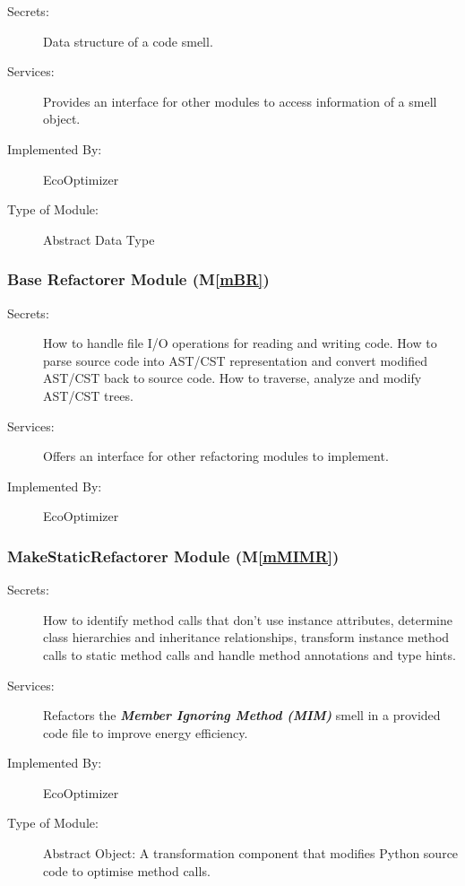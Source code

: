 \documentclass[12pt, titlepage]{article}
\newcommand{\mref}[1]{M\ref{#1}}
\begin{document}
\begin{description}
\item[Secrets:] Data structure of a code smell.
\item[Services:] Provides an interface for other modules to access information of a smell object.
\item[Implemented By:] EcoOptimizer
\item[Type of Module:] Abstract Data Type
\end{description}

\subsubsection{Base Refactorer Module (\mref{mBR})}


\begin{description}
    \item[Secrets:] How to handle file I/O operations for reading and writing code. How to parse source code into AST/CST representation and convert modified AST/CST back to source code. How to traverse, analyze and modify AST/CST trees.
    \item[Services:] Offers an interface for other refactoring modules to implement.
    \item[Implemented By:] EcoOptimizer
\end{description}

\subsubsection{MakeStaticRefactorer Module (\mref{mMIMR})}

\begin{description}
\item[Secrets:] How to identify method calls that don't use instance attributes, determine class hierarchies and inheritance relationships, transform instance method calls to static method calls and handle method annotations and type hints.
\item[Services:] Refactors the \textit{\textbf{Member Ignoring Method (MIM)}} smell in a provided code file to improve energy efficiency.
\item[Implemented By:] EcoOptimizer
\item[Type of Module:] Abstract Object: A transformation component that modifies Python source code to optimise method calls.
\end{description}
\end{document}

